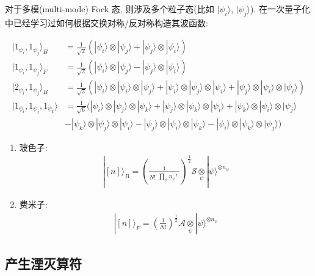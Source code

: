 \documentclass[../../main.tex]{subfiles}
\begin{document}
对于多模(multi-mode) Fock 态, 则涉及多个粒子态(比如 $|\psi_{i}\rangle$, $|\psi_{j}\rangle$). 在一次量子化中已经学习过如何根据交换对称/反对称构造其波函数:

\begin{align*}
  |1_{\psi_{i}},1_{\psi_{j}}\rangle_{B} &= \frac{1}{\sqrt{2}}(|\psi_{i}\rangle\otimes|\psi_{j}\rangle + |\psi_{j}\rangle\otimes|\psi_{i}\rangle)\\
  |1_{\psi_{i}},1_{\psi_{j}}\rangle_{F} &= \frac{1}{\sqrt{2}}(|\psi_{i}\rangle\otimes|\psi_{j}\rangle - |\psi_{j}\rangle\otimes|\psi_{i}\rangle)\\
  |2_{\psi_{i}},1_{\psi_{j}}\rangle_{B} &= \frac{1}{\sqrt{3}}(|\psi_{i}\rangle\otimes|\psi_{i}\rangle\otimes|\psi_{j}\rangle + |\psi_{i}\rangle\otimes|\psi_{j}\rangle\otimes|\psi_{i}\rangle + |\psi_{j}\rangle\otimes|\psi_{i}\rangle\otimes|\psi_{i}\rangle)\\
  |1_{\psi_{i}},1_{\psi_{j}},1_{\psi_{k}}\rangle &= \frac{1}{\sqrt{6}}(
    |\psi_{i}\rangle\otimes|\psi_{j}\rangle\otimes|\psi_{k}\rangle + |\psi_{j}\rangle\otimes |\psi_{k}\rangle\otimes |\psi_{i}\rangle + |\psi_{k}\rangle \otimes |\psi_{i}\rangle \otimes |\psi_{j}\rangle\\
  & - |\psi_{k}\rangle\otimes |\psi_{j}\rangle\otimes |\psi_{i}\rangle - |\psi_{j}\rangle\otimes |\psi_{i}\rangle\otimes |\psi_{k}\rangle - |\psi_{i}\rangle\otimes |\psi_{k}\rangle\otimes |\psi_{j}\rangle)
\end{align*}

\begin{enumerate}
  \item 玻色子:
  \begin{align*}
    |[n]\rangle_{B} = \left(
      \frac{1}{N!\begin{aligned}\prod_{\psi}n_{\psi}!
    \end{aligned}}
    \right)^{\frac{1}{2}}
    \mathcal{S}\underset{\psi}{\otimes}|\psi\rangle^{\otimes n_{\psi}}
  \end{align*}
  \item 费米子:
  \begin{align*}
    |[n]\rangle_{F} = \left(\frac{1}{N!}\right)^{\frac{1}{2}} \mathcal{A}\underset{\psi}{\otimes}|\psi\rangle^{\otimes n_{\psi}}
  \end{align*}
\end{enumerate}

\subsection{产生湮灭算符}
\end{document}
